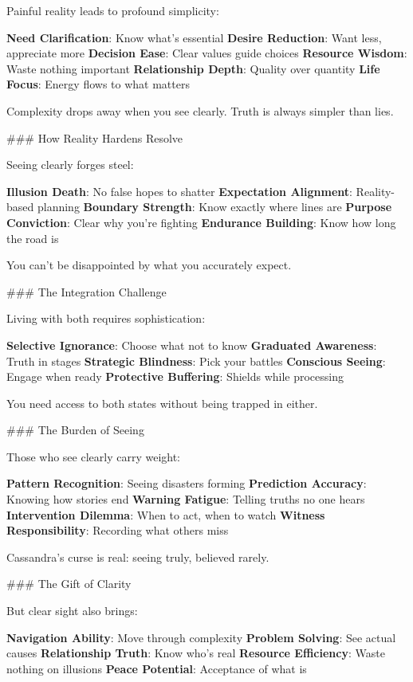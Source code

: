 \documentclass[12pt]{book}
\begin{document}
Painful reality leads to profound simplicity:

\textbf{Need Clarification}: Know what's essential
\textbf{Desire Reduction}: Want less, appreciate more
\textbf{Decision Ease}: Clear values guide choices
\textbf{Resource Wisdom}: Waste nothing important
\textbf{Relationship Depth}: Quality over quantity
\textbf{Life Focus}: Energy flows to what matters

Complexity drops away when you see clearly. Truth is always simpler than lies.

\#\#\# How Reality Hardens Resolve

Seeing clearly forges steel:

\textbf{Illusion Death}: No false hopes to shatter
\textbf{Expectation Alignment}: Reality-based planning
\textbf{Boundary Strength}: Know exactly where lines are
\textbf{Purpose Conviction}: Clear why you're fighting
\textbf{Endurance Building}: Know how long the road is

You can't be disappointed by what you accurately expect.

\#\#\# The Integration Challenge

Living with both requires sophistication:

\textbf{Selective Ignorance}: Choose what not to know
\textbf{Graduated Awareness}: Truth in stages
\textbf{Strategic Blindness}: Pick your battles
\textbf{Conscious Seeing}: Engage when ready
\textbf{Protective Buffering}: Shields while processing

You need access to both states without being trapped in either.

\#\#\# The Burden of Seeing

Those who see clearly carry weight:

\textbf{Pattern Recognition}: Seeing disasters forming
\textbf{Prediction Accuracy}: Knowing how stories end
\textbf{Warning Fatigue}: Telling truths no one hears
\textbf{Intervention Dilemma}: When to act, when to watch
\textbf{Witness Responsibility}: Recording what others miss

Cassandra's curse is real: seeing truly, believed rarely.

\#\#\# The Gift of Clarity

But clear sight also brings:

\textbf{Navigation Ability}: Move through complexity
\textbf{Problem Solving}: See actual causes
\textbf{Relationship Truth}: Know who's real
\textbf{Resource Efficiency}: Waste nothing on illusions
\textbf{Peace Potential}: Acceptance of what is
\end{document}
